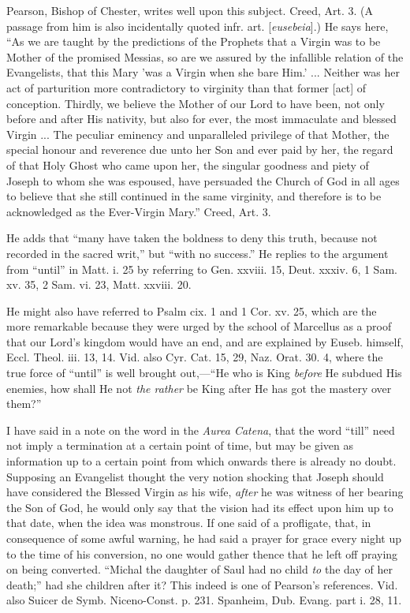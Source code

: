 Pearson, Bishop of Chester, writes well upon this
subject. Creed, Art. 3. (A passage from him is also incidentally
quoted infr. art. [\emph{eusebeia}].) He says here, ``As we are taught
by the predictions of the Prophets that a Virgin was to be Mother of
the promised Messias, so are we assured by the infallible relation of
the Evangelists, that this Mary 'was a Virgin when she bare Him.' ...
Neither was her act of parturition more contradictory to virginity
than that former [act] of conception. Thirdly, we believe the Mother
of our Lord to have been, not only before and after His
nativity, but also for ever, the most immaculate and blessed Virgin
... The peculiar eminency and unparalleled privilege of that Mother,
the special honour and reverence due unto her Son and ever paid by
her, the regard of that Holy Ghost who came upon her, the singular
goodness and piety of Joseph to whom she was espoused, have persuaded
the Church of God in all ages to believe that she still continued in
the same virginity, and therefore is to be acknowledged as the
Ever-Virgin Mary.'' Creed, Art. 3.

He adds that ``many have taken the boldness to
deny this truth, because not recorded in the sacred writ,'' but ``with
no success.'' He replies to the argument from ``until'' in Matt. i. 25 by
referring to Gen. xxviii. 15, Deut. xxxiv. 6, 1 Sam. xv. 35, 2 Sam.
vi. 23, Matt. xxviii. 20.

He might also have referred to Psalm cix. 1 and 1
Cor. xv. 25, which are the more remarkable because they were urged by
the school of Marcellus as a proof that our Lord's kingdom would have
an end, and are explained by Euseb. himself, Eccl. Theol. iii. 13, 14.
Vid. also Cyr. Cat. 15, 29, Naz. Orat. 30. 4, where the true force of ``until''
is well brought out,—``He who is King \emph{before} He subdued His
enemies, how shall He not \emph{the rather} be King after He has got
the mastery over them?''

I have said in a note on the word in the \emph{Aurea
Catena}, that the word ``till'' need not imply a termination at a
certain point of time, but may be given as information up to a certain
point from which onwards there is already no doubt. Supposing an
Evangelist thought the very notion shocking that Joseph should have
considered the Blessed Virgin as his wife, \emph{after} he was witness
of her bearing the Son of God, he would only say that the vision had
its effect upon him up to that date, when the idea was monstrous. If
one said of a profligate, that, in consequence of some awful warning,
he had said a prayer for grace every night up to the time of his
conversion, no one would gather thence that he left off praying on
being converted. ``Michal the daughter of Saul had no child \emph{to}
the day of her death;'' had she children after it? This indeed is one
of Pearson's references. Vid. also Suicer de Symb. Niceno-Const. p.
231. Spanheim, Dub. Evang. part i. 28, 11.

